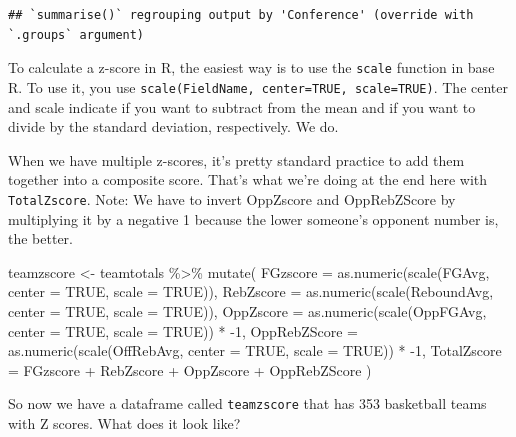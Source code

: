 \documentclass[
]{book}
\newenvironment{Shaded}{\begin{snugshade}}{\end{snugshade}}
\newcommand{\AttributeTok}[1]{\textcolor[rgb]{0.77,0.63,0.00}{#1}}
\newcommand{\ConstantTok}[1]{\textcolor[rgb]{0.00,0.00,0.00}{#1}}
\newcommand{\DecValTok}[1]{\textcolor[rgb]{0.00,0.00,0.81}{#1}}
\newcommand{\FunctionTok}[1]{\textcolor[rgb]{0.00,0.00,0.00}{#1}}
\newcommand{\NormalTok}[1]{#1}
\newcommand{\OtherTok}[1]{\textcolor[rgb]{0.56,0.35,0.01}{#1}}
\newcommand{\SpecialCharTok}[1]{\textcolor[rgb]{0.00,0.00,0.00}{#1}}
\begin{document}
\begin{verbatim}
## `summarise()` regrouping output by 'Conference' (override with `.groups` argument)
\end{verbatim}

To calculate a z-score in R, the easiest way is to use the \texttt{scale} function in base R. To use it, you use \texttt{scale(FieldName,\ center=TRUE,\ scale=TRUE)}. The center and scale indicate if you want to subtract from the mean and if you want to divide by the standard deviation, respectively. We do.

When we have multiple z-scores, it's pretty standard practice to add them together into a composite score. That's what we're doing at the end here with \texttt{TotalZscore}. Note: We have to invert OppZscore and OppRebZScore by multiplying it by a negative 1 because the lower someone's opponent number is, the better.

\begin{Shaded}
\begin{Highlighting}[]
\NormalTok{teamzscore }\OtherTok{\textless{}{-}}\NormalTok{ teamtotals }\SpecialCharTok{\%\textgreater{}\%} 
  \FunctionTok{mutate}\NormalTok{(}
    \AttributeTok{FGzscore =} \FunctionTok{as.numeric}\NormalTok{(}\FunctionTok{scale}\NormalTok{(FGAvg, }\AttributeTok{center =} \ConstantTok{TRUE}\NormalTok{, }\AttributeTok{scale =} \ConstantTok{TRUE}\NormalTok{)),}
    \AttributeTok{RebZscore =} \FunctionTok{as.numeric}\NormalTok{(}\FunctionTok{scale}\NormalTok{(ReboundAvg, }\AttributeTok{center =} \ConstantTok{TRUE}\NormalTok{, }\AttributeTok{scale =} \ConstantTok{TRUE}\NormalTok{)),}
    \AttributeTok{OppZscore =} \FunctionTok{as.numeric}\NormalTok{(}\FunctionTok{scale}\NormalTok{(OppFGAvg, }\AttributeTok{center =} \ConstantTok{TRUE}\NormalTok{, }\AttributeTok{scale =} \ConstantTok{TRUE}\NormalTok{)) }\SpecialCharTok{*} \SpecialCharTok{{-}}\DecValTok{1}\NormalTok{,}
    \AttributeTok{OppRebZScore =} \FunctionTok{as.numeric}\NormalTok{(}\FunctionTok{scale}\NormalTok{(OffRebAvg, }\AttributeTok{center =} \ConstantTok{TRUE}\NormalTok{, }\AttributeTok{scale =} \ConstantTok{TRUE}\NormalTok{)) }\SpecialCharTok{*} \SpecialCharTok{{-}}\DecValTok{1}\NormalTok{,}
    \AttributeTok{TotalZscore =}\NormalTok{ FGzscore }\SpecialCharTok{+}\NormalTok{ RebZscore }\SpecialCharTok{+}\NormalTok{ OppZscore }\SpecialCharTok{+}\NormalTok{ OppRebZScore}
\NormalTok{  )  }
\end{Highlighting}
\end{Shaded}

So now we have a dataframe called \texttt{teamzscore} that has 353 basketball teams with Z scores. What does it look like?
\end{document}
